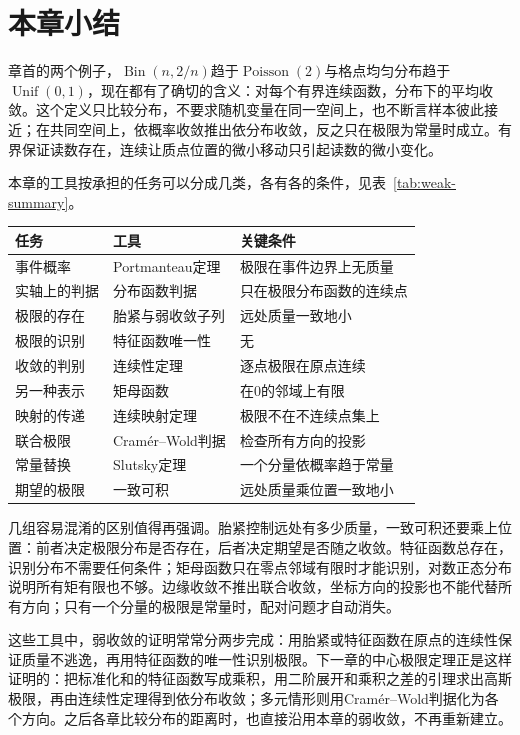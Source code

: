 \section{本章小结}
\label{sec:weak-summary}

章首的两个例子，$\operatorname{Bin}(n,2/n)$趋于$\operatorname{Poisson}(2)$与格点均匀分布趋于$\operatorname{Unif}(0,1)$，现在都有了确切的含义：对每个有界连续函数，分布下的平均收敛。这个定义只比较分布，不要求随机变量在同一空间上，也不断言样本彼此接近；在共同空间上，依概率收敛推出依分布收敛，反之只在极限为常量时成立。有界保证读数存在，连续让质点位置的微小移动只引起读数的微小变化。

本章的工具按承担的任务可以分成几类，各有各的条件，见表~\ref{tab:weak-summary}。

\begin{BookInlineTable}
 \centering
 \caption{弱收敛的工具及其条件}
 \label{tab:weak-summary}
 \begin{tabular}{@{}lll@{}}
 \toprule
 任务 & 工具 & 关键条件\\
 \midrule
 事件概率 & Portmanteau定理 & 极限在事件边界上无质量\\
 实轴上的判据 & 分布函数判据 & 只在极限分布函数的连续点\\
 极限的存在 & 胎紧与弱收敛子列 & 远处质量一致地小\\
 极限的识别 & 特征函数唯一性 & 无\\
 收敛的判别 & 连续性定理 & 逐点极限在原点连续\\
 另一种表示 & 矩母函数 & 在$0$的邻域上有限\\
 映射的传递 & 连续映射定理 & 极限不在不连续点集上\\
 联合极限 & Cramér--Wold判据 & 检查所有方向的投影\\
 常量替换 & Slutsky定理 & 一个分量依概率趋于常量\\
 期望的极限 & 一致可积 & 远处质量乘位置一致地小\\
 \bottomrule
 \end{tabular}
\end{BookInlineTable}

几组容易混淆的区别值得再强调。胎紧控制远处有多少质量，一致可积还要乘上位置：前者决定极限分布是否存在，后者决定期望是否随之收敛。特征函数总存在，识别分布不需要任何条件；矩母函数只在零点邻域有限时才能识别，对数正态分布说明所有矩有限也不够。边缘收敛不推出联合收敛，坐标方向的投影也不能代替所有方向；只有一个分量的极限是常量时，配对问题才自动消失。

这些工具中，弱收敛的证明常常分两步完成：用胎紧或特征函数在原点的连续性保证质量不逃逸，再用特征函数的唯一性识别极限。下一章的中心极限定理正是这样证明的：把标准化和的特征函数写成乘积，用二阶展开和乘积之差的引理求出高斯极限，再由连续性定理得到依分布收敛；多元情形则用Cramér--Wold判据化为各个方向。之后各章比较分布的距离时，也直接沿用本章的弱收敛，不再重新建立。
